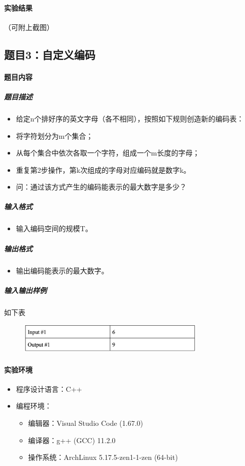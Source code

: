 \documentclass[12pt,a4paper]{ctexart}
\begin{document}
\paragraph{实验结果}
（可附上截图）

\newpage


\subsection*{题目3：自定义编码}
\paragraph{题目内容}
\subparagraph{题目描述}

\begin{itemize}
    \item 给定n个排好序的英文字母（各不相同），按照如下规则创造新的编码表：
    \item 将字符划分为m个集合；
    \item 从每个集合中依次各取一个字符，组成一个m长度的字母；
    \item 重复第2步操作，第k次组成的字母对应编码就是数字k。
    \item 问：通过该方式产生的编码能表示的最大数字是多少？
\end{itemize}

\subparagraph{输入格式}
    \begin{itemize}
        \item 输入编码空间的规模T。
    \end{itemize}

\subparagraph{输出格式}
    \begin{itemize}
        \item 输出编码能表示的最大数字。
    \end{itemize}
    

\subparagraph{输入输出样例}
如下表
    \begin{figure}[h]
        \centering
        \includegraphics[width=0.80\textwidth]{q3_iodata.png}
    \end{figure}

\vspace{5pt}

\paragraph{实验环境}
\begin{itemize}
    \item 程序设计语言：C++
    \item 编程环境：
    \begin{itemize}
        \item 编辑器：Visual Studio Code (1.67.0)
        \item 编译器：g++ (GCC) 11.2.0
        \item 操作系统：ArchLinux 5.17.5-zen1-1-zen (64-bit)
    \end{itemize}
\end{itemize}
\end{document}
